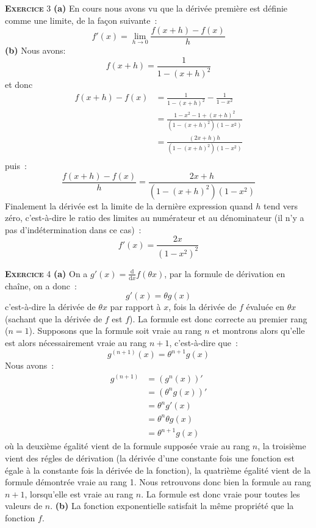 \documentclass[10pt,a4paper,notitlepage]{article}
\newcommand{\exercice}[1]{\textsc{\textbf{Exercice}} #1}
\begin{document}
\bigskip

\exercice{3} \textbf{(a)} En cours nous avons vu que la dérivée première est définie comme une limite, de la façon suivante :
\[
f'(x) = \lim_{h\rightarrow 0} \frac{f(x+h)-f(x)}{h}
\]
\textbf{(b)} Nous avons:
\[
f(x+h) = \frac{1}{1-(x+h)^2}
\]
et donc
\[
  \begin{split}
    f(x+h)-f(x) &= \frac{1}{1-(x+h)^2} - \frac{1}{1-x^2}\\
    &= \frac{1-x^{2}-1+(x+h)^{2}}{\left(1-(x+h)^2\right)\left(1-x^{2}\right)}\\
    &= \frac{(2x+h)h}{\left(1-(x+h)^2\right)\left(1-x^{2}\right)}\\
  \end{split}
\]
puis :
\[
\frac{f(x+h)-f(x)}{h} = \frac{2x+h}{\left(1-(x+h)^2\right)\left(1-x^{2}\right)}
\]
Finalement la dérivée est la limite de la dernière expression quand $h$ tend vers zéro, c'est-à-dire le ratio des limites au numérateur et au dénominateur (il n'y a pas d'indétermination dans ce cas) :
\[
f'(x) = \frac{2x}{\left(1-x^{2}\right)^{2}}
\]


\bigskip

\exercice{4} \textbf{(a)} On a $g'(x) = \frac{\mathrm d}{\mathrm dx}f(\theta x)$, par la formule de dérivation en chaîne, on a donc :
\[
g'(x) = \theta g(x)
\]
c'est-à-dire la dérivée de $\theta x$ par rapport à $x$, fois la dérivée de $f$ évaluée en $\theta x$ (sachant que la dérivée de $f$ est $f$). La formule est donc correcte au premier rang ($n=1$). Supposons que la formule soit vraie au rang $n$ et montrons alors qu'elle est alors nécessairement vraie au rang $n+1$, c'est-à-dire que :
\[
g^{(n+1)}(x) = \theta^{n+1}g(x)
\]
Nous avons :
\[
  \begin{split}
    g^{(n+1)} &= \left(g^{n}(x)\right)'\\
    &= \left(\theta^{n}g(x)\right)'\\
    &= \theta^{n}g'(x)\\
    &= \theta^{n}\theta g(x)\\
    &= \theta^{n+1}g(x)
  \end{split}
\]
où la deuxième égalité vient de la formule supposée vraie au rang $n$, la troisième vient des régles de dérivation (la dérivée d'une constante fois une fonction est égale à la constante fois la dérivée de la fonction), la quatrième égalité vient de la formule démontrée vraie au rang 1. Nous retrouvons donc bien la formule au rang $n+1$, lorsqu'elle est vraie au rang $n$. La formule est donc vraie pour toutes les valeurs de $n$. \textbf{(b)} La fonction exponentielle satisfait la même propriété que la fonction $f$.
\end{document}
